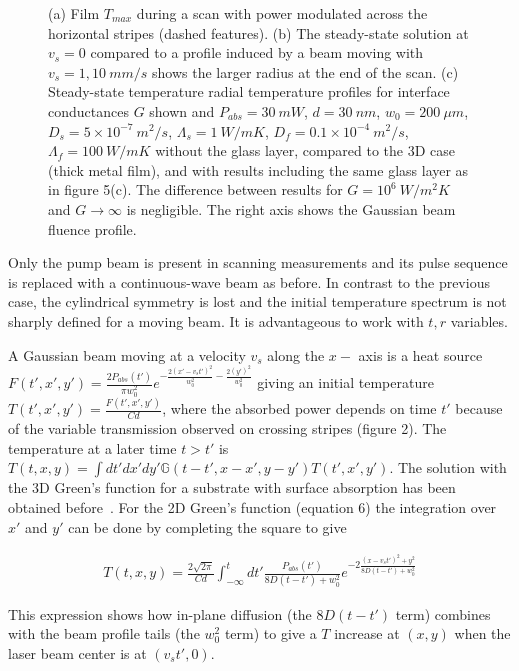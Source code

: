 \documentclass[5p]{elsarticle}
\begin{document}
\begin{figure}
\centering{}
\caption{\label{fig:Figure1} (a) Film $T_{max}$ during a scan with power modulated across the horizontal stripes (dashed features). (b) The steady-state solution at $v_{s}=0$ compared to a profile induced by a beam moving with $v_{s}=1,10~mm/s$ shows the larger radius at the end of the scan. (c) Steady-state temperature radial temperature profiles for interface conductances $G$ shown and $P_{abs}=30~mW$, $d = 30~nm$, $w_{0} = 200~\mu m$, $D_{s} = 5\times 10^{-7}~m^{2}/s$, $\Lambda_{s} = 1~W/mK$, $D_{f} = 0.1 \times10^{-4}~m^{2}/s$, $\Lambda_{f} = 100~W/mK$ without the glass layer, compared to the 3D case (thick metal film), and with results including the same glass layer as in figure 5(c). The difference between results for $G=10^{6}~W/m^{2}K$ and $G\rightarrow \infty$ is negligible. The right axis shows the Gaussian beam fluence profile.}
\end{figure}

Only the pump beam is present in scanning measurements and its pulse sequence is replaced with a continuous-wave beam as before. In contrast to the previous case, the cylindrical symmetry is lost and the initial temperature spectrum is not sharply defined for a moving beam. It is advantageous to work with $t,r$ variables.

A Gaussian beam moving at a velocity $v_{s}$ along the $x-$ axis is a heat source $F(t',x',y')=\frac{2P_{abs}(t')}{\pi w_{0}^{2}}e^{-\frac{2(x'-v_{s}t')^{2}}{w_{0}^{2}}-\frac{2(y')^{2}}{w_{0}^{2}}}$ giving an initial temperature $T(t',x',y')=\frac{F(t',x',y')}{Cd}$, where the absorbed power depends on time $t'$ because of the variable transmission observed on crossing stripes (figure 2). The temperature at a later time $t>t'$ is $T(t,x,y)=\int dt'dx'dy' \mathbb{G}(t-t',x-x',y-y') T(t',x',y')$. The solution with the 3D Green's function for a substrate with surface absorption has been obtained before~\cite{1980Nissim}. For the 2D Green's function (equation 6) the integration over $x'$ and $y'$ can be done by completing the square to give

\begin{eqnarray}
T(t,x,y)= \frac{2\sqrt{2\pi}}{Cd} \int_{-\infty} ^{t} dt'\frac{P_{abs}(t')}{8D(t-t')+w_{0}^{2}} e^{-2\frac{(x-v_{s}t')^{2}+y^{2}}{8D(t-t')+w_{0}^{2}}}
\end{eqnarray}

\noindent This expression shows how in-plane diffusion (the $8D(t-t')$ term) combines with the beam profile tails (the $w_{0}^{2}$ term) to give a $T$ increase at $(x,y)$ when the laser beam center is at $(v_{s}t',0)$.
\end{document}
